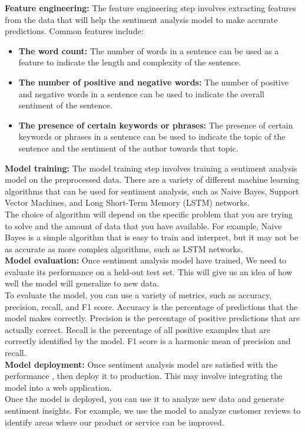 \documentclass[a4paper, 12pt]{report}
\begin{document}
\textbf{Feature engineering:}
The feature engineering step involves extracting features from the data that will help the sentiment analysis model to make accurate predictions. Common features include:
\begin{itemize}
	\item \textbf{The word count:} The number of words in a sentence can be used as a feature to indicate the length and complexity of the sentence.
	\item \textbf{The number of positive and negative words:} The number of positive and negative words in a sentence can be used to indicate the overall sentiment of the sentence.
	\item \textbf{The presence of certain keywords or phrases:} The presence of certain keywords or phrases in a sentence can be used to indicate the topic of the sentence and the sentiment of the author towards that topic.
\end{itemize}
\textbf{Model training:}
The model training step involves training a sentiment analysis model on the preprocessed data. There are a variety of different machine learning algorithms that can be used for sentiment analysis, such as Naive Bayes, Support Vector Machines, and Long Short-Term Memory (LSTM) networks.\\
The choice of algorithm will depend on the specific problem that you are trying to solve and the amount of data that you have available. For example, Naive Bayes is a simple algorithm that is easy to train and interpret, but it may not be as accurate as more complex algorithms, such as LSTM networks.
\\
\textbf{Model evaluation:} Once sentiment analysis model have trained, We need to evaluate its performance on a held-out test set. This will give us an idea of how well the model will generalize to new data.\\
To evaluate the model, you can use a variety of metrics, such as accuracy, precision, recall, and F1 score. Accuracy is the percentage of predictions that the model makes correctly. Precision is the percentage of positive predictions that are actually correct. Recall is the percentage of all positive examples that are correctly identified by the model. F1 score is a harmonic mean of precision and recall.
\\
\textbf{Model deployment:} Once sentiment analysis model are satisfied with the performance , then deploy it to production. This may involve integrating the model into a web application.\\
Once the model is deployed, you can use it to analyze new data and generate sentiment insights. For example, we use the model to analyze customer reviews to identify areas where our product or service can be improved.
\end{document}
